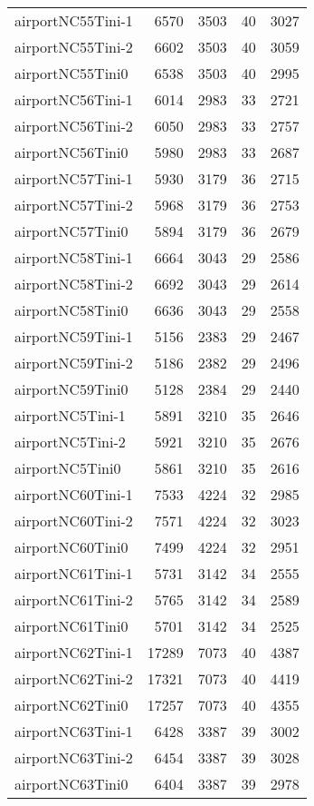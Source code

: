 \documentclass[../../../thesis.tex]{subfiles}
\begin{document}
\begin{longtable}{lrrrr}
airportNC55Tini-1 & 6570 & 3503 & 40 & 3027 \\
airportNC55Tini-2 & 6602 & 3503 & 40 & 3059 \\
airportNC55Tini0 & 6538 & 3503 & 40 & 2995 \\
airportNC56Tini-1 & 6014 & 2983 & 33 & 2721 \\
airportNC56Tini-2 & 6050 & 2983 & 33 & 2757 \\
airportNC56Tini0 & 5980 & 2983 & 33 & 2687 \\
airportNC57Tini-1 & 5930 & 3179 & 36 & 2715 \\
airportNC57Tini-2 & 5968 & 3179 & 36 & 2753 \\
airportNC57Tini0 & 5894 & 3179 & 36 & 2679 \\
airportNC58Tini-1 & 6664 & 3043 & 29 & 2586 \\
airportNC58Tini-2 & 6692 & 3043 & 29 & 2614 \\
airportNC58Tini0 & 6636 & 3043 & 29 & 2558 \\
airportNC59Tini-1 & 5156 & 2383 & 29 & 2467 \\
airportNC59Tini-2 & 5186 & 2382 & 29 & 2496 \\
airportNC59Tini0 & 5128 & 2384 & 29 & 2440 \\
airportNC5Tini-1 & 5891 & 3210 & 35 & 2646 \\
airportNC5Tini-2 & 5921 & 3210 & 35 & 2676 \\
airportNC5Tini0 & 5861 & 3210 & 35 & 2616 \\
airportNC60Tini-1 & 7533 & 4224 & 32 & 2985 \\
airportNC60Tini-2 & 7571 & 4224 & 32 & 3023 \\
airportNC60Tini0 & 7499 & 4224 & 32 & 2951 \\
airportNC61Tini-1 & 5731 & 3142 & 34 & 2555 \\
airportNC61Tini-2 & 5765 & 3142 & 34 & 2589 \\
airportNC61Tini0 & 5701 & 3142 & 34 & 2525 \\
airportNC62Tini-1 & 17289 & 7073 & 40 & 4387 \\
airportNC62Tini-2 & 17321 & 7073 & 40 & 4419 \\
airportNC62Tini0 & 17257 & 7073 & 40 & 4355 \\
airportNC63Tini-1 & 6428 & 3387 & 39 & 3002 \\
airportNC63Tini-2 & 6454 & 3387 & 39 & 3028 \\
airportNC63Tini0 & 6404 & 3387 & 39 & 2978 \\

\end{longtable}
\end{document}
